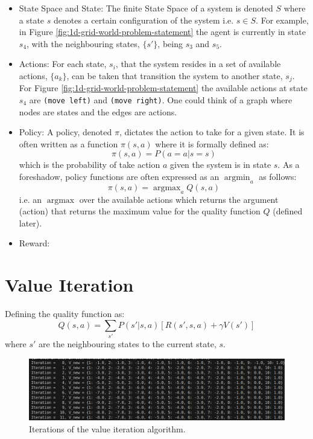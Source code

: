 \documentclass[a4paper,11pt]{article}
\DeclareMathOperator*{\argmax}{argmax}
\DeclareMathOperator*{\argmin}{argmin}
\begin{document}
\begin{itemize}
    \item State Space and State: The finite State Space of a system is denoted $S$ where a state $s$ denotes a certain configuration of the system i.e. $s \in S$.  For example, in Figure \ref{fig:1d-grid-world-problem-statement} the agent is currently in state $s_4$, with the neighbouring states, $\{s'\}$, being $s_3$ and $s_5$.
    \item Actions: For each state, $s_i$, that the system resides in a set of available actions, $\{a_k\}$, can be taken that transition the system to another state, $s_j$.  For Figure \ref{fig:1d-grid-world-problem-statement} the available actions at state $s_4$ are \verb|(move left)| and \verb|(move right)|.  One could think of a graph where nodes are states and the edges are actions.
    \item Policy: A policy, denoted $\pi$, dictates the action to take for a given state.  It is often written as a function $\pi(s, a)$ where it is formally defined as:
    \begin{equation} \label{eqn:policy_formal_definition}
        \pi(s,a) = P(a=a|s=s)
    \end{equation}
    which is the probability of take action $a$ given the system is in state $s$.  As a foreshadow, policy functions are often expressed as an $\argmin_a$ as follows:
    \begin{equation} \label{eqn:value_iteration_foreshadow}
        \pi(s,a) = \argmax_a Q(s, a)
    \end{equation}
    i.e. an $\argmax$ over the available actions which returns the argument (action) that returns the maximum value for the quality function $Q$ (defined later).
    \item Reward: 
  \end{itemize}

\section{Value Iteration}

Defining the quality function as:
\begin{equation} \label{eqn:quality_function_Q}
    Q(s,a) = \sum_{s'} P(s'|s,a) \left[ R(s',s,a) + \gamma V(s') \right]
\end{equation}
where $s'$ are the neighbouring states to the current state, $s$.



\begin{figure}
    \includegraphics[width=\textwidth]{images/iters-of-value-iteration-1d-grid-world-code-output.png}
    \caption{Iterations of the value iteration algorithm.}
    \label{fig:iters-of-value-iteration-1d-grid-world-code-output}
\end{figure}
\end{document}
